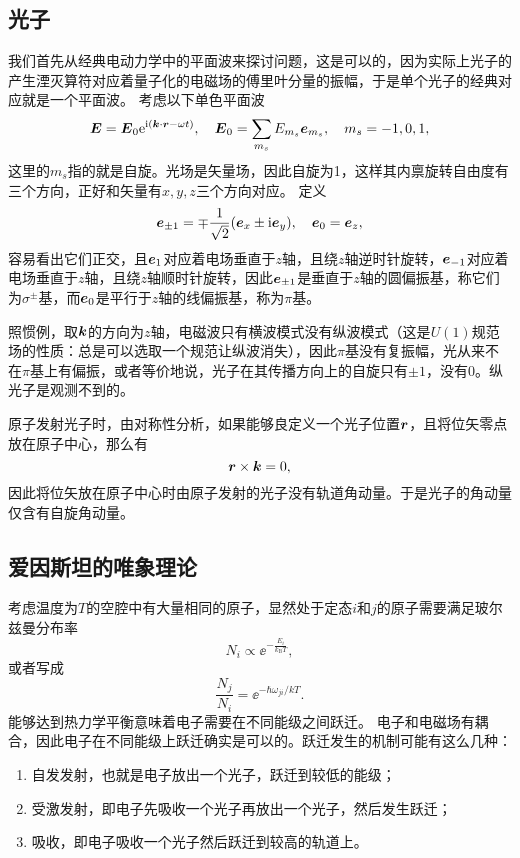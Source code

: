 \subsection{光子}

我们首先从经典电动力学中的平面波来探讨问题，这是可以的，因为实际上光子的产生湮灭算符对应着量子化的电磁场的傅里叶分量的振幅，于是单个光子的经典对应就是一个平面波。
考虑以下单色平面波
\begin{equation}
    \vb*{E} = \vb*{E}_0 \mathrm{e}^{\mathrm{i}(\vb*{k} \cdot \vb*{r} - \omega t)}, \quad \vb*{E}_0 = \sum_{m_s} E_{m_s} \vb*{e}_{m_s}, \quad m_s = -1, 0, 1,
\end{equation}
这里的$m_s$指的就是自旋。光场是矢量场，因此自旋为1，这样其内禀旋转自由度有三个方向，正好和矢量有$x, y, z$三个方向对应。
定义
\begin{equation}
    \vb*{e}_{\pm 1} = \mp \frac{1}{\sqrt{2}} (\vb*{e}_x \pm \mathrm{i} \vb*{e}_y), \quad \vb*{e}_0 = \vb*{e}_z,
\end{equation}
容易看出它们正交，且$\vb*{e}_1$对应着电场垂直于$z$轴，且绕$z$轴逆时针旋转，$\vb*{e}_{-1}$对应着电场垂直于$z$轴，且绕$z$轴顺时针旋转，因此$\vb*{e}_{\pm 1}$是垂直于$z$轴的圆偏振基，称它们为$\sigma^\pm$基，而$\vb*{e}_0$是平行于$z$轴的线偏振基，称为$\pi$基。

照惯例，取$\vb*{k}$的方向为$z$轴，电磁波只有横波模式没有纵波模式（这是$U(1)$规范场的性质：总是可以选取一个规范让纵波消失），因此$\pi$基没有复振幅，光从来不在$\pi$基上有偏振，或者等价地说，光子在其传播方向上的自旋只有$\pm 1$，没有$0$。纵光子是观测不到的。

原子发射光子时，由对称性分析，如果能够良定义一个光子位置$\vb*{r}$，且将位矢零点放在原子中心，那么有
\[
    \vb*{r} \times \vb*{k} = 0,
\]
因此将位矢放在原子中心时由原子发射的光子没有轨道角动量。于是光子的角动量仅含有自旋角动量。

\subsection{爱因斯坦的唯象理论}\label{sec:einstein-phonomenon}

考虑温度为$T$的空腔中有大量相同的原子，显然处于定态$i$和$j$的原子需要满足玻尔兹曼分布率
\[
    N_i \propto \ee^{-\frac{E_i}{k_\text{B} T}},
\]
或者写成
\[
    \frac{N_j}{N_i} = \ee^{-\hbar \omega_{ji} / kT}.
\]
能够达到热力学平衡意味着电子需要在不同能级之间跃迁。
电子和电磁场有耦合，因此电子在不同能级上跃迁确实是可以的。跃迁发生的机制可能有这么几种：
\begin{enumerate}
    \item 自发发射，也就是电子放出一个光子，跃迁到较低的能级；
    \item 受激发射，即电子先吸收一个光子再放出一个光子，然后发生跃迁；
    \item 吸收，即电子吸收一个光子然后跃迁到较高的轨道上。
\end{enumerate}

